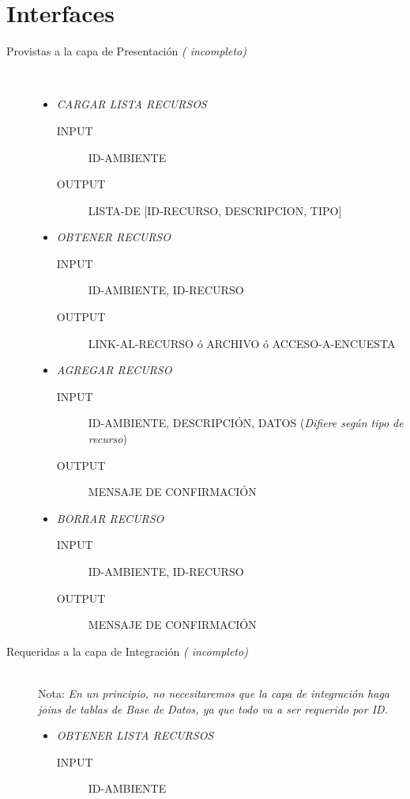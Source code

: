 \documentclass{article}
\begin{document}
\section{Interfaces}
	\begin{description}
		\item[Provistas a la capa de Presentaci\'on  \emph{( incompleto)}] \
		\renewcommand{\labelitemi}{\ding{105}} 
		\begin{itemize}
			\item \emph{CARGAR LISTA RECURSOS}
			\begin{description}
				\item[INPUT] ID-AMBIENTE
				\item[OUTPUT] LISTA-DE [ID-RECURSO, DESCRIPCION, TIPO]
			\end{description}
			\item \emph{OBTENER RECURSO}
			\begin{description}
				\item[INPUT] ID-AMBIENTE, ID-RECURSO
				\item[OUTPUT] LINK-AL-RECURSO \'o ARCHIVO \'o ACCESO-A-ENCUESTA
			\end{description}
			\item \emph{AGREGAR RECURSO}
			\begin{description}
				\item[INPUT] ID-AMBIENTE, DESCRIPCI\'ON, DATOS (\emph{Difiere seg\'un tipo de recurso})
				\item[OUTPUT] MENSAJE DE CONFIRMACI\'ON
			\end{description}
			\item \emph{BORRAR RECURSO}
			\begin{description}
				\item[INPUT] ID-AMBIENTE, ID-RECURSO
				\item[OUTPUT] MENSAJE DE CONFIRMACI\'ON
			\end{description}
		\end{itemize}
		\renewcommand{\labelitemi}{\ding{118}} 
		\item[Requeridas a la capa de Integraci\'on \emph{( incompleto)}] \
		\\Nota:
		\emph{ En un principio, no necesitaremos que la capa de integraci\'on haga joins de tablas de Base de Datos, ya que todo va a ser requerido por ID.}
		\begin{itemize}
			\item \emph{OBTENER LISTA RECURSOS}
			\begin{description}
				\item[INPUT] ID-AMBIENTE

\end{description}
\end{itemize}
\end{description}
\end{document}
